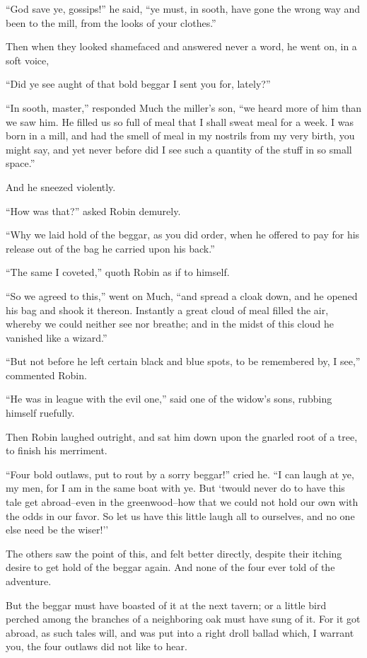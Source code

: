 ``God save ye, gossips!'' he said, ``ye must, in sooth, have gone the
wrong way and been to the mill, from the looks of your clothes.''

Then when they looked shamefaced and answered never a word, he went on,
in a soft voice,

``Did ye see aught of that bold beggar I sent you for, lately?''

``In sooth, master,'' responded Much the miller's son, ``we heard more
of him than we saw him. He filled us so full of meal that I shall sweat
meal for a week. I was born in a mill, and had the smell of meal in my
nostrils from my very birth, you might say, and yet never before did I
see such a quantity of the stuff in so small space.''

And he sneezed violently.

``How was that?'' asked Robin demurely.

``Why we laid hold of the beggar, as you did order, when he offered to
pay for his release out of the bag he carried upon his back.''

``The same I coveted,'' quoth Robin as if to himself.

``So we agreed to this,'' went on Much, ``and spread a cloak down, and
he opened his bag and shook it thereon. Instantly a great cloud of meal
filled the air, whereby we could neither see nor breathe; and in the
midst of this cloud he vanished like a wizard.''

``But not before he left certain black and blue spots, to be remembered
by, I see,'' commented Robin.

``He was in league with the evil one,'' said one of the widow's sons,
rubbing himself ruefully.

Then Robin laughed outright, and sat him down upon the gnarled root of a
tree, to finish his merriment.

``Four bold outlaws, put to rout by a sorry beggar!'' cried he. ``I can
laugh at ye, my men, for I am in the same boat with ye. But `twould
never do to have this tale get abroad--even in the greenwood--how that
we could not hold our own with the odds in our favor. So let us have
this little laugh all to ourselves, and no one else need be the wiser!''

The others saw the point of this, and felt better directly, despite
their itching desire to get hold of the beggar again. And none of the
four ever told of the adventure.

But the beggar must have boasted of it at the next tavern; or a little
bird perched among the branches of a neighboring oak must have sung of
it. For it got abroad, as such tales will, and was put into a right
droll ballad which, I warrant you, the four outlaws did not like to
hear.

